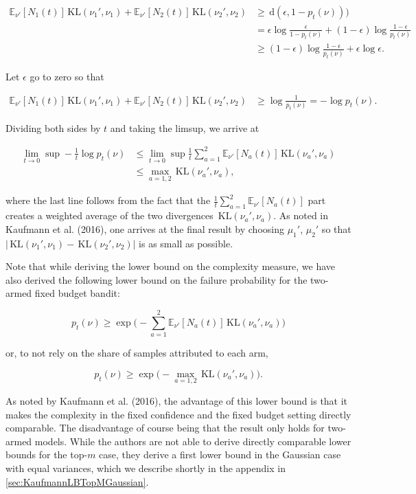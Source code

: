 \documentclass[11pt,]{article}
\newcommand{\KL}{\,\text{KL}}
\newcommand{\der}{\,\text{d}}
\begin{document}
\begin{align*}
\mathbb{E}_{\nu'}[N_1(t)]\KL(\nu_1', \nu_1) + \mathbb{E}_{\nu'}[N_2(t)]\KL(\nu_2', \nu_2) & \geq \der(\epsilon,1-p_t(\nu))) \\
& = \epsilon \log \frac{\epsilon}{1-p_t(\nu)} + (1-\epsilon) \log \frac{1-\epsilon}{p_t(\nu)} \\
& \geq (1-\epsilon) \log \frac{1-\epsilon}{p_t(\nu)} + \epsilon \log \epsilon.
\end{align*}

Let \(\epsilon\) go to zero so that

\begin{align*}
\mathbb{E}_{\nu'}[N_1(t)]\KL(\nu_1', \nu_1) + \mathbb{E}_{\nu'}[N_2(t)]\KL(\nu_2', \nu_2)
& \geq \log \frac{1}{p_t(\nu)} = -\log p_t(\nu).
\end{align*}

Dividing both sides by \(t\) and taking the limsup, we arrive at

\begin{align*}
\lim_{t \to 0} \sup - \frac{1}{t} \log p_t(\nu)
& \leq \lim_{t \to 0} \sup \frac{1}{t} \sum_{a=1}^2 \mathbb{E}_{\nu'}[N_a(t)] \KL(\nu_a', \nu_a) \\
& \leq \max_{a=1,2} \KL(\nu_a', \nu_a),
\end{align*}

where the last line follows from the fact that the
\(\frac{1}{t} \sum_{a=1}^2 \mathbb{E}_{\nu'}[N_a(t)]\) part creates a
weighted average of the two divergences \(\KL(\nu_a', \nu_a)\). As noted
in Kaufmann et al. (2016), one arrives at the final result by choosing
\(\mu_1'\), \(\mu_2'\) so that
\(| \KL(\nu_1', \nu_1) - \KL(\nu_2', \nu_2) |\) is as small as possible.

Note that while deriving the lower bound on the complexity measure, we
have also derived the following lower bound on the failure probability
for the two-armed fixed budget bandit:

\begin{equation*}
p_t(\nu) \geq \exp \big(- \sum_{a=1}^2 \mathbb{E}_{\nu'}[N_a(t)] \KL(\nu_a', \nu_a) \big)
\end{equation*}

or, to not rely on the share of samples attributed to each arm,

\begin{equation*}
p_t(\nu) \geq \exp \big(- \max_{a=1,2} \KL(\nu_a', \nu_a) \big).
\end{equation*}

As noted by Kaufmann et al. (2016), the advantage of this lower bound is
that it makes the complexity in the fixed confidence and the fixed
budget setting directly comparable. The disadvantage of course being
that the result only holds for two-armed models. While the authors are
not able to derive directly comparable lower bounds for the top-\(m\)
case, they derive a first lower bound in the Gaussian case with equal
variances, which we describe shortly in the appendix in
\autoref{sec:KaufmannLBTopMGaussian}.
\end{document}
